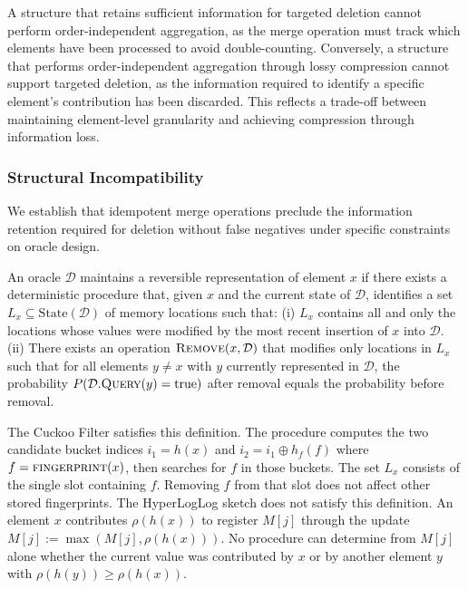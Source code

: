 A structure that retains sufficient information for targeted deletion cannot perform order-independent aggregation, as the merge operation must track which elements have been processed to avoid double-counting. Conversely, a structure that performs order-independent aggregation through lossy compression cannot support targeted deletion, as the information required to identify a specific element's contribution has been discarded. This reflects a trade-off between maintaining element-level granularity and achieving compression through information loss.

\subsubsection{Structural Incompatibility}

We establish that idempotent merge operations preclude the information retention required for deletion without false negatives under specific constraints on oracle design.

\begin{definition}
    An oracle $\mathcal{D}$ maintains a reversible representation of element $x$ if there exists a deterministic procedure that, given $x$ and the current state of $\mathcal{D}$, identifies a set $L_x \subseteq \text{State}(\mathcal{D})$ of memory locations such that: (i) $L_x$ contains all and only the locations whose values were modified by the most recent insertion of $x$ into $\mathcal{D}$. (ii) There exists an operation $\textsc{Remove}(x, \mathcal{D})$ that modifies only locations in $L_x$ such that for all elements $y \neq x$ with $y$ currently represented in $\mathcal{D}$, the probability $P(\mathcal{D}.\textsc{Query}(y) = \text{true})$ after removal equals the probability before removal.
\end{definition}

The Cuckoo Filter satisfies this definition. The procedure computes the two candidate bucket indices $i_1 = h(x)$ and $i_2 = i_1 \oplus h_f(f)$ where $f = \textsc{fingerprint}(x)$, then searches for $f$ in those buckets. The set $L_x$ consists of the single slot containing $f$. Removing $f$ from that slot does not affect other stored fingerprints. The HyperLogLog sketch does not satisfy this definition. An element $x$ contributes $\rho(h(x))$ to register $M[j]$ through the update $M[j] := \max(M[j], \rho(h(x)))$. No procedure can determine from $M[j]$ alone whether the current value was contributed by $x$ or by another element $y$ with $\rho(h(y)) \geq \rho(h(x))$.

